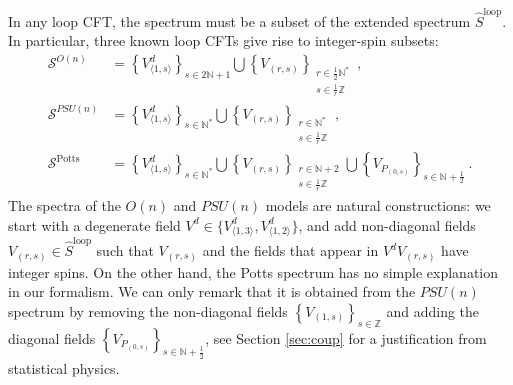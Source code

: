 \documentclass[12pt, a4paper]{article}
\begin{document}
In any loop CFT, the spectrum must be a subset of the extended spectrum $\widehat{S}^\text{loop}$. In particular, three known loop CFTs give rise to integer-spin subsets:
\begin{align}
\mathcal{S}^{O(n)} &= \left\{V^d_{\langle 1,s\rangle}\right\}_{s\in 2\mathbb{N}+1} \bigcup \left\{V_{(r,s)}\right\}_{\substack{r\in \frac12\mathbb{N}^*\\ s\in\frac{1}{r}\mathbb{Z}}}  \ ,
\label{son}
 \\
 \mathcal{S}^{PSU(n)} &= \left\{V^d_{\langle 1,s\rangle}\right\}_{s\in\mathbb{N}^*} \bigcup \left\{V_{(r,s)}\right\}_{\substack{r\in \mathbb{N}^*\\ s\in\frac{1}{r}\mathbb{Z}}}  \ ,
 \label{sun}
 \\
 \mathcal{S}^\text{Potts} &= \left\{V^d_{\langle 1,s\rangle}\right\}_{s\in\mathbb{N}^*} \bigcup \left\{V_{(r,s)}\right\}_{\substack{r\in \mathbb{N}+2\\ s\in\frac{1}{r}\mathbb{Z}}} \bigcup  \left\{ V_{P_{(0,s)}}\right\}_{s\in \mathbb{N}+\frac12}\ .
 \label{spotts}
\end{align}
The spectra of the $O(n)$ and $PSU(n)$ models are natural constructions: we start with a degenerate field $V^d\in\{V^d_{\langle 1,3\rangle},V^d_{\langle 1,2\rangle}\}$, and add non-diagonal fields $V_{(r,s)}\in\widehat{S}^\text{loop}$ such that $V_{(r,s)}$ and the fields that appear in $V^dV_{(r,s)}$ have integer spins.
On the other hand, the Potts spectrum has no simple explanation in our formalism. We can only remark that it is obtained from the $PSU(n)$ spectrum by removing the non-diagonal fields $\left\{V_{(1,s)}\right\}_{s\in\mathbb{Z}}$ and adding the diagonal fields $\left\{ V_{P_{(0,s)}}\right\}_{s\in \mathbb{N}+\frac12}$, see Section \ref{sec:coup} for a justification from statistical physics.  
\end{document}
